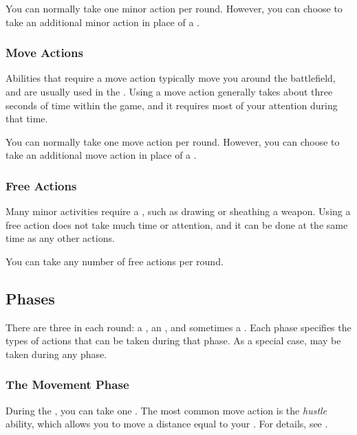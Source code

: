             You can normally take one minor action per round.
            However, you can choose to take an additional minor action in place of a .

        \subsubsection{Move Actions}\label{Move Actions}
            Abilities that require a move action typically move you around the battlefield, and are usually used in the .
            Using a move action generally takes about three seconds of time within the game, and it requires most of your attention during that time.

            You can normally take one move action per round.
            However, you can choose to take an additional move action in place of a .

        \subsubsection{Free Actions}\label{Free Actions}
            Many minor activities require a , such as drawing or sheathing a weapon.
            Using a free action does not take much time or attention, and it can be done at the same time as any other actions.

            You can take any number of free actions per round.

    \subsection{Phases}\label{Phases}

        There are three  in each round: a , an , and sometimes a .
        Each phase specifies the types of actions that can be taken during that phase.
        As a special case,  may be taken during any phase.

        \subsubsection{The Movement Phase}\label{The Movement Phase}
            During the , you can take one .
            The most common move action is the \textit{hustle} ability, which allows you to move a distance equal to your .
            For details, see .

